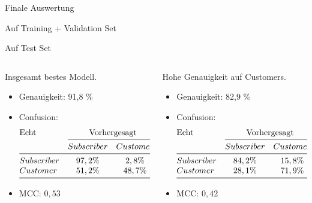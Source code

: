 \begin{frame}{Finale Auswertung}

{
 Auf Training + Validation Set

 Auf Test Set
}

\begin{columns}
\begin{column}{0.5\textwidth}
{
Insgesamt bestes Modell.
\begin{itemize}
\item Genauigkeit: 91,8 \%
\item Confusion:
\[
\begin{array}{@{}l*{5}{c}@{}}
\text{Echt} & \multicolumn{2}{c@{}}{\text{Vorhergesagt}}\\
    \cmidrule(l){2-3}
    & Subscriber & Customer\\
\midrule
Subscriber & 97,2 \% & 2,8 \% \\
Customer   & 51,2 \% & 48,7 \% \\
\bottomrule
\end{array}
\]
\item MCC: $0,53$
\end{itemize}
}
\end{column}
\begin{column}{0.5\textwidth}
{
Hohe Genauigkeit auf Customers.
\begin{itemize}
\item Genauigkeit: 82,9 \%
\item Confusion:
\[
\begin{array}{@{}l*{5}{c}@{}}
\text{Echt} & \multicolumn{2}{c@{}}{\text{Vorhergesagt}}\\
    \cmidrule(l){2-3}
    & Subscriber & Customer\\
\midrule
Subscriber & 84,2 \% & 15,8 \% \\
Customer   & 28,1 \% & 71,9 \% \\
\bottomrule
\end{array}
\]
\item MCC: $0,42$
\end{itemize}
}
\end{column}
\end{columns}
\end{frame}

